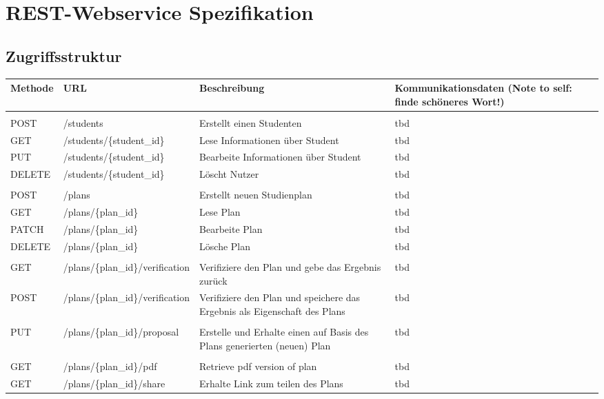 \section{REST-Webservice Spezifikation}

\subsection{Zugriffsstruktur}

\begin{tabularx}{\textwidth}{@{} | X | X | X | X | @{}}
	\hline
	\textbf{Methode} & \textbf{URL} & \textbf{Beschreibung} & \textbf{\hspace{0pt}Kommunikationsdaten (Note to self: finde schöneres Wort!)} \\ \hline  \hline
	& & & \\ \hline
	POST & /students & Erstellt einen Studenten & tbd
	\\ \hline
	GET & /students/\{student\_id\} & Lese Informationen über Student & tbd
	\\ \hline
	PUT & /students/\{student\_id\} & Bearbeite Informationen über Student & tbd
	\\ \hline
	DELETE & /students/\{student\_id\} & Löscht Nutzer & tbd \\ \hline
	& & & \\ \hline
	POST & /plans & Erstellt neuen Studienplan & tbd \\ \hline
	GET & /plans/\{plan\_id\} & Lese Plan & tbd \\ \hline
	PATCH & /plans/\{plan\_id\} & Bearbeite Plan & tbd \\ \hline
	DELETE & /plans/\{plan\_id\} & Lösche Plan & tbd \\ \hline
	& & & \\ \hline
	GET & /plans/\{plan\_id\}/verification & Verifiziere den Plan und gebe das Ergebnis zurück & tbd \\ \hline
	POST & /plans/\{plan\_id\}/verification & Verifiziere den Plan und speichere das Ergebnis als Eigenschaft des Plans & tbd \\ \hline
	& & & \\ \hline
	PUT & /plans/\{plan\_id\}/proposal & Erstelle und Erhalte einen auf Basis des Plans generierten (neuen) Plan & tbd \\ \hline
	& & & \\ \hline
	GET & /plans/\{plan\_id\}/pdf & Retrieve pdf version of plan & tbd \\ \hline
	GET & /plans/\{plan\_id\}/share & Erhalte Link zum teilen des Plans & tbd \\ \hline
\end{tabularx}

